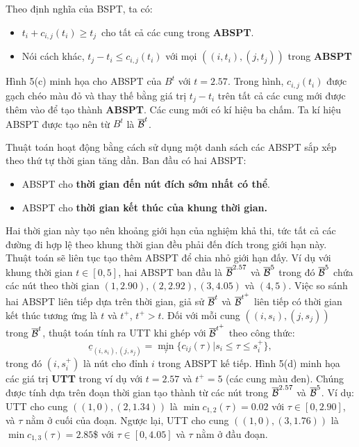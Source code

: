 \documentclass[../main.tex]{subfiles}
\begin{document}
Theo định nghĩa của BSPT, ta có:

\begin{itemize}
\tightlist
\item
  \(t_i + c_{i,j}(t_i) \ge t_j\)~cho tất cả các cung trong
  \textbf{ABSPT}.
\item
  Nói cách khác, \(t_j - t_i \le c_{i,j}(t_i)\) với mọi
  \(((i, t_i), (j, t_j))\) trong \textbf{ABSPT}
\end{itemize}

Hình 5(c) minh họa
cho ABSPT của \(B^t\) với \(t = 2.57\). Trong hình, \(c_{i,j}(t_i)\)
được gạch chéo màu đỏ và thay thế bằng giá trị \(t_j - t_i\) trên tất cả
các cung mới được thêm vào để tạo thành \textbf{ABSPT}. Các cung mới có
kí hiệu ba chấm. Ta kí hiệu ABSPT được tạo nên từ \(B^t\) là
\(\overline{\cal B}^t\).

Thuật toán hoạt động bằng cách sử dụng một danh sách các ABSPT
sắp xếp theo thứ tự thời gian tăng dần. Ban đầu có hai ABSPT:

\begin{itemize}
\tightlist
\item
  ABSPT cho \textbf{thời gian đến nút đích sớm nhất có thể}.
\item
  ABSPT cho \textbf{thời gian kết thúc của khung thời gian.}
\end{itemize}

Hai thời gian này tạo nên khoảng giới hạn của nghiệm khả thi, tức tất cả các đường đi
hợp lệ theo khung thời gian đều phải đến đích trong giới hạn này. Thuật
toán sẽ liên tục tạo thêm ABSPT để chia nhỏ giới hạn đấy. Ví dụ với
khung thời gian \(t\in [0,5]\), hai ABSPT ban đầu là
\(\overline{\cal B}^{2.57}\) và \(\overline{\cal B}^{5}\) trong đó
\(\overline{\cal B}^{5}\) chứa các nút theo thời gian
\((1, 2.90), (2, 2.92), (3, 4.05)\) và \((4, 5)\). Việc so sánh hai ABSPT liên tiếp dựa trên thời gian,
giả sử \(\overline{\cal B}^t\) và
\(\overline{\cal B}^{t^+}\) liên tiếp có thời gian kết thúc tương ứng là
\(t\) và \(t^+\), \(t^+>t\). Đối với mỗi cung \(((i, s_i), (j, s_j))\)
trong \(\overline{\cal B}^t\), thuật toán tính ra UTT khi ghép với
\(\overline{\cal B}^{t^+}\) theo công thức:
\[    \underline c_{(i, s_i),(j, s_j)}=\min_\tau\{c_{ij}(\tau)|s_i\le\tau\le s_i^+\},\]
trong đó \((i, s_i^+)\) là nút cho đỉnh \(i\) trong ABSPT kế tiếp. Hình 5(d)
minh họa các giá trị \textbf{UTT} trong ví dụ với \(t = 2.57\) và
\(t^+  = 5\) (các cung màu đen). Chúng được tính dựa trên đoạn thời gian
tạo thành từ các nút trong \(\overline{\cal B}^{2.57}\) và
\(\overline{\cal B}^{5}\). Ví dụ: UTT cho cung \(((1, 0),(2, 1.34))\) là
\(\min c_{1, 2}(\tau) = 0.02\) với \(\tau \in [0, 2.90]\), và \(\tau\)
nằm ở cuối của đoạn. Ngược lại, UTT cho cung \(((1, 0),(3, 1.76))\) là
\(\min c_{1,3}(\tau) = 2.85\)\$ với \(\tau \in [0, 4.05]\) và \(\tau\)
nằm ở đầu đoạn.
\end{document}

